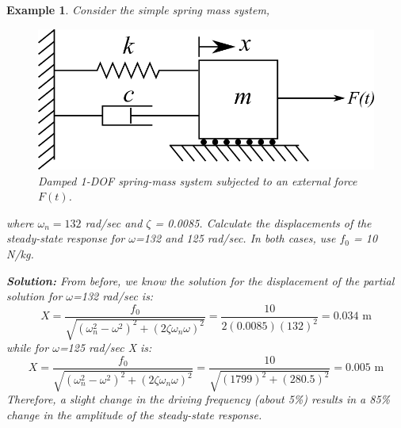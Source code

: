\documentclass[12pt,letter]{article}
\newtheorem{ex}{Example}
\numberwithin{ex}{section} %
\newenvironment{example}{\begin{mdframed}[middlelinewidth=0.5mm]\begin{ex}\normalfont}{\end{ex}\end{mdframed}}
\numberwithin{re}{section} %
\begin{document}
\begin{example}

			Consider the simple spring mass system, 
			\begin{figure}[H]
				\centering
				\includegraphics[]{../Figures/1-DOF-spring_dashpot_mass_horizontal_forced.png}
				\caption{Damped 1-DOF spring-mass system subjected to an external force $F(t)$.}
			\end{figure}				
			where $\omega_n = 132$ rad/sec and $\zeta$ = 0.0085. Calculate the displacements of the steady-state response for $\omega$=132 and 125 rad/sec. In both cases, use $f_0$ = 10 N/kg. 

			\noindent\textbf{Solution:}	From before, we know the solution for the displacement of the partial solution for $\omega$=132 rad/sec is:
			\begin{equation}
				X = \frac{f_0}{\sqrt{(\omega_n^2 - \omega^2)^2 +  (2\zeta \omega_n \omega)^2}} = \frac{10}{2(0.0085)(132)^2} = 0.034 \text{ m}
			\end{equation}							
			while for $\omega$=125 rad/sec X is:
			\begin{equation}
				X = \frac{f_0}{\sqrt{(\omega_n^2 - \omega^2)^2 +  (2\zeta \omega_n \omega)^2}} = \frac{10}{\sqrt{(1799)^2 +  (280.5)^2}}  = 0.005 \text{ m}
			\end{equation}				
			Therefore, a slight change in the driving frequency (about 5\%) results in a 85\% change in the amplitude of the steady-state response. 
\end{example}
\end{document}
